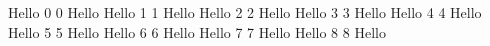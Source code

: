 \documentclass[12pt]{article}
\begin{document}
Hello 0
0 Hello
\newpage
Hello 1
1 Hello
\newpage
Hello 2
2 Hello
\newpage
Hello 3
3 Hello
\newpage
Hello 4
4 Hello
\newpage
Hello 5
5 Hello
\newpage
Hello 6
6 Hello
\newpage
Hello 7
7 Hello
\newpage
Hello 8
8 Hello
\newpage
\end{document}
